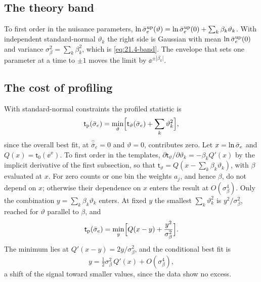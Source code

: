 \subsection{The theory band}

To first order in the nuisance parameters, $\ln\bar{\sigma}_{e}^{\mathrm{up}}(\vartheta) = \ln\bar{\sigma}_{e}^{\mathrm{up}}(0) + \sum_k\beta_k\vartheta_k$. With independent standard-normal $\vartheta_k$ the right side is Gaussian with mean $\ln\bar{\sigma}_{e}^{\mathrm{up}}(0)$ and variance $\sigma_\beta^2 = \sum_k\beta_k^2$, which is \cref{eq:21.4-band}. The envelope that sets one parameter at a time to $\pm1$ moves the limit by $\ee^{\pm|\beta_k|}$.

\subsection{The cost of profiling}

With standard-normal constraints the profiled statistic is
\begin{equation*}
  \mathsf{t}_{\mathrm{p}}(\bar{\sigma}_{e}) = \min_\vartheta\Bigl[\mathsf{t}_\vartheta(\bar{\sigma}_{e}) + \sum_k\vartheta_k^2\Bigr] ,
\end{equation*}
since the overall best fit, at $\hat{\bar\sigma}_e = 0$ and $\vartheta = 0$, contributes zero. Let $x = \ln\bar{\sigma}_{e}$ and $Q(x) = \mathsf{t}_0(\ee^x)$. To first order in the templates, $\partial\mathsf{t}_\vartheta/\partial\vartheta_k = -\beta_kQ'(x)$ by the implicit derivative of the first subsection, so that $\mathsf{t}_\vartheta = Q(x - \sum_k\beta_k\vartheta_k)$, with $\beta$ evaluated at $x$. For zero counts or one bin the weights $a_j$, and hence $\beta$, do not depend on $x$; otherwise their dependence on $x$ enters the result at $O(\sigma_\beta^4)$. Only the combination $y = \sum_k\beta_k\vartheta_k$ enters. At fixed $y$ the smallest $\sum_k\vartheta_k^2$ is $y^2/\sigma_\beta^2$, reached for $\vartheta$ parallel to $\beta$, and
\begin{equation*}
  \mathsf{t}_{\mathrm{p}}(\bar{\sigma}_{e}) = \min_y\Bigl[Q(x - y) + \frac{y^2}{\sigma_\beta^2}\Bigr] .
\end{equation*}
The minimum lies at $Q'(x - y) = 2y/\sigma_\beta^2$, and the conditional best fit is
\begin{equation}
  y = \tfrac12\sigma_\beta^2\,Q'(x) + O(\sigma_\beta^4) ,
  \label{eq:D.47-yhat}
\end{equation}
a shift of the signal toward smaller values, since the data show no excess.

